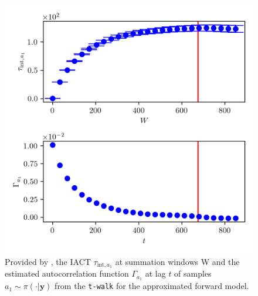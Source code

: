 \begin{figure}[ht!]
	\centering
	\includegraphics{UwerrTauIntTWalk7.png}
	\caption[IACT and autocorrelation function of samples $a_1 \sim \pi(\cdot|\bm{y})$, for approximated model.]{Provided by \cite{drikHesse}, the IACT $\tau_{\text{int},a_1}$ at summation windows W and the estimated autocorrelation function $\Gamma_{a_1}$ at lag $t$ of samples $a_1 \sim \pi( \cdot| \bm{y})$ from the \texttt{t-walk} for the approximated forward model.}
	\label{fig:TWalkIATC8}
\end{figure}


